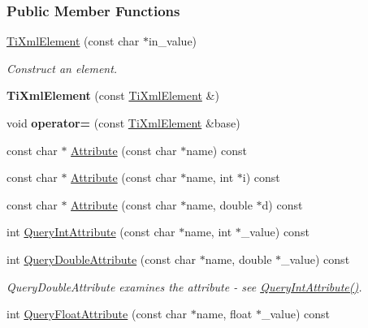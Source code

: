 \subsubsection*{Public Member Functions}
\begin{DoxyCompactItemize}
\item 
\hypertarget{class_ti_xml_element_a01bc3ab372d35da08efcbbe65ad90c60}{
\hyperlink{class_ti_xml_element_a01bc3ab372d35da08efcbbe65ad90c60}{TiXmlElement} (const char $\ast$in\_\-value)}
\label{class_ti_xml_element_a01bc3ab372d35da08efcbbe65ad90c60}

\begin{DoxyCompactList}\small\item\em Construct an element. \item\end{DoxyCompactList}\item 
\hypertarget{class_ti_xml_element_a1ca4465f3c2eac6a60e641cd7f1d9f7e}{
{\bfseries TiXmlElement} (const \hyperlink{class_ti_xml_element}{TiXmlElement} \&)}
\label{class_ti_xml_element_a1ca4465f3c2eac6a60e641cd7f1d9f7e}

\item 
\hypertarget{class_ti_xml_element_af5cd4156e082ef3bf23adfe0ed173340}{
void {\bfseries operator=} (const \hyperlink{class_ti_xml_element}{TiXmlElement} \&base)}
\label{class_ti_xml_element_af5cd4156e082ef3bf23adfe0ed173340}

\item 
const char $\ast$ \hyperlink{class_ti_xml_element_ac1e4691e9375ba4e665dce7e46a50a9c}{Attribute} (const char $\ast$name) const 
\item 
const char $\ast$ \hyperlink{class_ti_xml_element_aa9192e80567b5042dbded80b78c44339}{Attribute} (const char $\ast$name, int $\ast$i) const 
\item 
const char $\ast$ \hyperlink{class_ti_xml_element_aec4f727f8aa49b51248d80125d173136}{Attribute} (const char $\ast$name, double $\ast$d) const 
\item 
int \hyperlink{class_ti_xml_element_aea0bfe471380f281c5945770ddbf52b9}{QueryIntAttribute} (const char $\ast$name, int $\ast$\_\-value) const 
\item 
\hypertarget{class_ti_xml_element_a898d7730ecc341f0bffc7a9dadbf1ce7}{
int \hyperlink{class_ti_xml_element_a898d7730ecc341f0bffc7a9dadbf1ce7}{QueryDoubleAttribute} (const char $\ast$name, double $\ast$\_\-value) const }
\label{class_ti_xml_element_a898d7730ecc341f0bffc7a9dadbf1ce7}

\begin{DoxyCompactList}\small\item\em QueryDoubleAttribute examines the attribute -\/ see \hyperlink{class_ti_xml_element_aea0bfe471380f281c5945770ddbf52b9}{QueryIntAttribute()}. \item\end{DoxyCompactList}\item 
\hypertarget{class_ti_xml_element_aa04d3af11601ef5a5f88295203a843be}{
int \hyperlink{class_ti_xml_element_aa04d3af11601ef5a5f88295203a843be}{QueryFloatAttribute} (const char $\ast$name, float $\ast$\_\-value) const }
\label{class_ti_xml_element_aa04d3af11601ef5a5f88295203a843be}


\end{DoxyCompactItemize}
